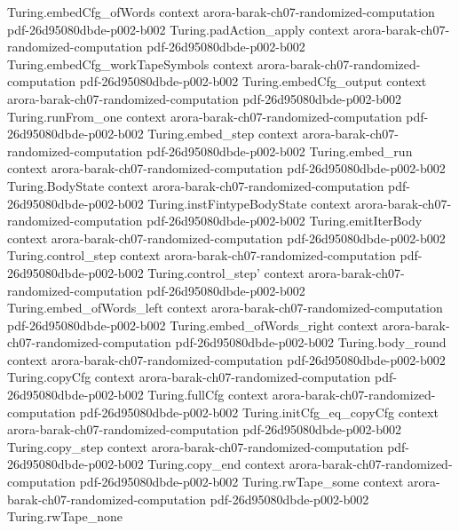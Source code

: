 \begin{theorem}
  {Turing.embedCfg_ofWords}
  {context}
  {arora-barak-ch07-randomized-computation}
  {pdf-26d95080dbde-p002-b002}
\proofstep
  {Turing.padAction_apply}
  {context}
  {arora-barak-ch07-randomized-computation}
  {pdf-26d95080dbde-p002-b002}
\proofstep
  {Turing.embedCfg_workTapeSymbols}
  {context}
  {arora-barak-ch07-randomized-computation}
  {pdf-26d95080dbde-p002-b002}
\proofstep
  {Turing.embedCfg_output}
  {context}
  {arora-barak-ch07-randomized-computation}
  {pdf-26d95080dbde-p002-b002}
\proofstep
  {Turing.runFrom_one}
  {context}
  {arora-barak-ch07-randomized-computation}
  {pdf-26d95080dbde-p002-b002}
\proofstep
  {Turing.embed_step}
  {context}
  {arora-barak-ch07-randomized-computation}
  {pdf-26d95080dbde-p002-b002}
\proofstep
  {Turing.embed_run}
  {context}
  {arora-barak-ch07-randomized-computation}
  {pdf-26d95080dbde-p002-b002}
\proofstep
  {Turing.BodyState}
  {context}
  {arora-barak-ch07-randomized-computation}
  {pdf-26d95080dbde-p002-b002}
\proofstep
  {Turing.instFintypeBodyState}
  {context}
  {arora-barak-ch07-randomized-computation}
  {pdf-26d95080dbde-p002-b002}
\proofstep
  {Turing.emitIterBody}
  {context}
  {arora-barak-ch07-randomized-computation}
  {pdf-26d95080dbde-p002-b002}
\proofstep
  {Turing.control_step}
  {context}
  {arora-barak-ch07-randomized-computation}
  {pdf-26d95080dbde-p002-b002}
\proofstep
  {Turing.control_step'}
  {context}
  {arora-barak-ch07-randomized-computation}
  {pdf-26d95080dbde-p002-b002}
\proofstep
  {Turing.embed_ofWords_left}
  {context}
  {arora-barak-ch07-randomized-computation}
  {pdf-26d95080dbde-p002-b002}
\proofstep
  {Turing.embed_ofWords_right}
  {context}
  {arora-barak-ch07-randomized-computation}
  {pdf-26d95080dbde-p002-b002}
\proofstep
  {Turing.body_round}
  {context}
  {arora-barak-ch07-randomized-computation}
  {pdf-26d95080dbde-p002-b002}
\proofstep
  {Turing.copyCfg}
  {context}
  {arora-barak-ch07-randomized-computation}
  {pdf-26d95080dbde-p002-b002}
\proofstep
  {Turing.fullCfg}
  {context}
  {arora-barak-ch07-randomized-computation}
  {pdf-26d95080dbde-p002-b002}
\proofstep
  {Turing.initCfg_eq_copyCfg}
  {context}
  {arora-barak-ch07-randomized-computation}
  {pdf-26d95080dbde-p002-b002}
\proofstep
  {Turing.copy_step}
  {context}
  {arora-barak-ch07-randomized-computation}
  {pdf-26d95080dbde-p002-b002}
\proofstep
  {Turing.copy_end}
  {context}
  {arora-barak-ch07-randomized-computation}
  {pdf-26d95080dbde-p002-b002}
\proofstep
  {Turing.rwTape_some}
  {context}
  {arora-barak-ch07-randomized-computation}
  {pdf-26d95080dbde-p002-b002}
\proofstep
  {Turing.rwTape_none}

\end{theorem}
